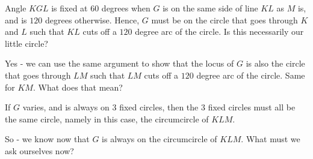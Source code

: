 










Angle $KGL$ is fixed at $60$ degrees when $G$ is on the same side of line $KL$ as $M$ is, and is $120$ degrees otherwise. Hence, $G$ must be on the circle that goes through $K$ and $L$ such that $KL$ cuts off a $120$ degree arc of the circle. Is this necessarily our little circle?


Yes - we can use the same argument to show that the locus of $G$ is also the circle that goes through $LM$ such that $LM$ cuts off a $120$ degree arc of the circle. Same for $KM.$ What does that mean?

If $G$ varies, and is always on $3$ fixed circles, then the $3$ fixed circles must all be the same circle, namely in this case, the circumcircle of $KLM.$

So - we know now that $G$ is always on the circumcircle of $KLM.$  What must we ask ourselves now?



